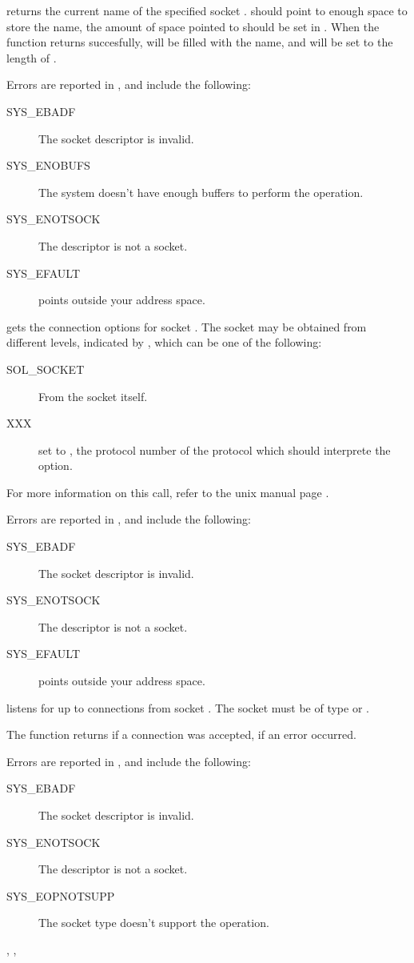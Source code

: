 { returns the current name of the specified socket
.  should point to enough space to store the name, the
amount of space pointed to should be set in . 
When the function returns succesfully,  will be filled with the 
name, and  will be set to the length of .}
{Errors are reported in , and include the following:
\begin{description}
\item[SYS\_EBADF] The socket descriptor is invalid.
\item[SYS\_ENOBUFS] The system doesn't have enough buffers to perform the
operation.
\item[SYS\_ENOTSOCK] The descriptor is not a socket.
\item[SYS\_EFAULT]  points outside your address space.
\end{description}
}{}


{ gets the connection options for socket .
The socket may be obtained from different levels, indicated by ,
which can be one of the following:
\begin{description}
\item[SOL\_SOCKET] From the socket itself. 
\item[XXX] set  to , the protocol number of the protocol
which should interprete the option.
 \end{description}
For more information on this call, refer to the unix manual page .
}
{Errors are reported in , and include the following:
\begin{description}
\item[SYS\_EBADF] The socket descriptor is invalid.
\item[SYS\_ENOTSOCK] The descriptor is not a socket.
\item[SYS\_EFAULT]  points outside your address space.
\end{description}
}
{}

{ listens for up to  connections from socket
. The socket  must be of type  or
.

The function returns  if a connection was accepted,  
if an error occurred.
}
{Errors are reported in , and include the following:
\begin{description}
\item[SYS\_EBADF] The socket descriptor is invalid.
\item[SYS\_ENOTSOCK] The descriptor is not a socket.
\item[SYS\_EOPNOTSUPP] The socket type doesn't support the 
operation.
\end{description}
}{, , }

